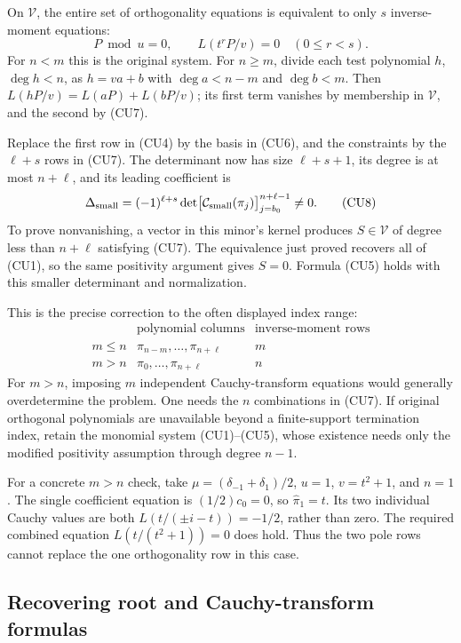\documentclass[11pt,a4paper]{article}
\theoremstyle{definition}
\begin{document}
On $\mathcal V$, the entire set of orthogonality equations is
equivalent to only $s$ inverse-moment equations:
\[
 P\bmod u=0,\qquad L(t^rP/v)=0\quad(0\le r<s).
 \tag{CU7}
\]
For $n<m$ this is the original system. For $n\ge m$, divide each
test polynomial $h$, $\deg h<n$, as $h=v a+b$ with
$\deg a<n-m$ and $\deg b<m$. Then
$L(hP/v)=L(aP)+L(bP/v)$; its first term vanishes by membership in
$\mathcal V$, and the second by (CU7).

Replace the first row in (CU4) by the basis in (CU6), and the
constraints by the $\ell+s$ rows in (CU7). The determinant now has
size $\ell+s+1$, its degree is at most $n+\ell$, and its leading
coefficient is
\[
 \Delta_{\rm small}=(-1)^{\ell+s}
 \det\!\big[\mathcal C_{\rm small}(\pi_j)\big]_
          {j=b_0}^{n+\ell-1}\ne0.
 \tag{CU8}
\]
To prove nonvanishing, a vector in this minor's kernel produces
$S\in\mathcal V$ of degree less than $n+\ell$ satisfying (CU7).
The equivalence just proved recovers all of (CU1), so the same
positivity argument gives $S=0$.
Formula (CU5) holds with this smaller determinant and normalization.

This is the precise correction to the often displayed index range:
\[
 \begin{array}{c|c|c}
 &\text{polynomial columns}&\text{inverse-moment rows}\\\hline
 m\le n&\pi_{n-m},\ldots,\pi_{n+\ell}&m\\
 m>n&\pi_0,\ldots,\pi_{n+\ell}&n
 \end{array}
\]
For $m>n$, imposing $m$ independent Cauchy-transform equations would
generally overdetermine the problem. One needs the $n$ combinations
in (CU7). If original orthogonal polynomials are unavailable beyond
a finite-support termination index, retain the monomial system
(CU1)--(CU5), whose existence needs only the modified positivity
assumption through degree $n-1$.

For a concrete $m>n$ check, take $\mu=(\delta_{-1}+\delta_1)/2$,
$u=1$, $v=t^2+1$, and $n=1$. The single coefficient equation is
$(1/2)c_0=0$, so $\widehat\pi_1=t$. Its two individual Cauchy
values are both $L(t/(\pm i-t))=-1/2$, rather than zero. The required
combined equation $L(t/(t^2+1))=0$ does hold. Thus the two pole rows
cannot replace the one orthogonality row in this case.

\subsection{Recovering root and Cauchy-transform formulas}
\end{document}
